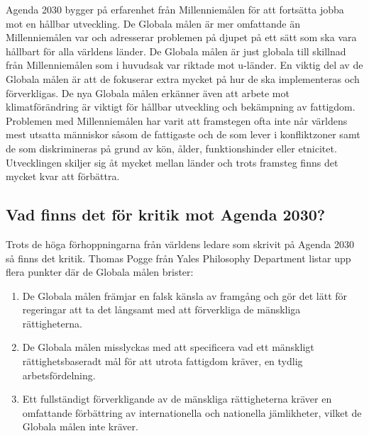\documentclass{report}
\begin{document}
Agenda 2030 bygger på erfarenhet från Millenniemålen för att fortsätta jobba mot en hållbar utveckling. \cite{webEuropeanComission}
De Globala målen är mer omfattande än Millenniemålen var och adresserar problemen på djupet på ett sätt som ska vara hållbart för alla världens länder. De Globala målen är just globala till skillnad från Millenniemålen som i huvudsak var riktade mot u-länder. En viktig del av de Globala målen är att de fokuserar extra mycket på hur de ska implementeras och förverkligas. De nya Globala målen erkänner även att arbete mot klimatförändring är viktigt för hållbar utveckling och bekämpning av fattigdom. \cite{web2030agenda}
Problemen med Millenniemålen har varit att framstegen ofta inte når världens mest utsatta människor såsom de fattigaste och de som lever i konfliktzoner samt de som diskrimineras på grund av kön, ålder, funktionshinder eller etnicitet. Utvecklingen skiljer sig åt mycket mellan länder och trots framsteg finns det mycket kvar att förbättra. \cite{MIllennium} \\

\subsection{Vad finns det för kritik mot Agenda 2030?} 
Trots de höga förhoppningarna från världens ledare som skrivit på Agenda 2030 så finns det kritik. Thomas Pogge från Yales Philosophy Department listar upp flera punkter där de Globala målen brister: 

\begin{enumerate}
\item De Globala målen främjar en falsk känsla av framgång och gör det lätt för regeringar att ta det långsamt med att förverkliga de mänskliga rättigheterna. 
\item De Globala målen misslyckas med att specificera vad ett mänskligt rättighetsbaseradt mål för att utrota fattigdom kräver, en tydlig arbetsfördelning. 
\item Ett fullständigt förverkligande av de mänskliga rättigheterna kräver en omfattande förbättring av internationella och nationella jämlikheter, vilket de Globala målen inte kräver. \cite{critique}\\
\end{enumerate} 
\end{document}
